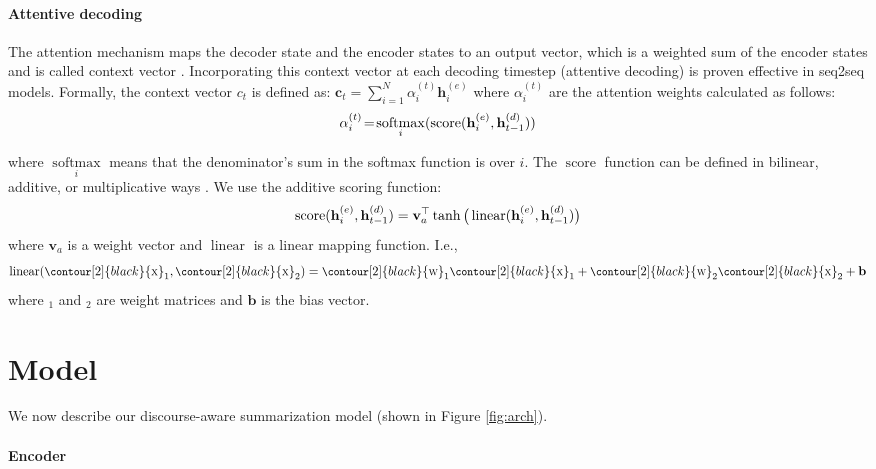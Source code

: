 \documentclass[11pt,a4paper]{article}
\newcommand{\V}[1][\mathbf]{#1}
\newcommand{\encstate}[1]{\mathbf{h}_{#1}^{(e)}}
\newcommand{\decstate}[1]{\mathbf{h}_{#1}^{(d)}}
\DeclareMathOperator{\linear}{linear}
\newcommand{\newsoftmax}{\mathop{\mathrm{softmax}}}
\DeclareMathOperator{\score}{score}
\begin{document}
\paragraph{Attentive decoding}

The attention mechanism maps the decoder state and the encoder states to an output vector, which is a weighted sum of the encoder states and is called context vector \cite{bahdanau2014neural}. Incorporating this context vector at each decoding timestep (attentive decoding) is proven effective in seq2seq models.
Formally, the context vector $c_t$ is defined as: $ \V{c}_t \!=\! \sum_{i=1}^{N}\alpha^{(t)}_i \encstate{i} $
where $\alpha^{(t)}_i$ are the attention weights calculated as follows:
\begin{equation}\small \alpha^{(t)}_i \!=\! \newsoftmax_{i}(\score(\encstate{i}, \decstate{t-1})) \end{equation}

\noindent where {\small$\newsoftmax\limits_{i}$} means that the denominator's sum in the softmax function is over $i$. The $\score$ function can be defined in bilinear, additive, or multiplicative ways \cite{luong2015effective}. We use the additive scoring function:
\begin{equation}
  \small
  \score(\encstate{i}, \decstate{t-1}) = \V{v}_a^\top \tanh \big( \linear(\encstate{i}, \decstate{t-1}) \big) \label{eq:score-attn}
\end{equation}
\noindent where $\V{v}_a$ is a weight vector and $\linear$ is a linear mapping function. I.e.,
\begin{equation}
\small
\linear(\contour[2]{black}{\textsc{x}}_1, \contour[2]{black}{\textsc{x}}_2) = \contour[2]{black}{\textsc{w}}_1 \contour[2]{black}{\textsc{x}}_1 + \contour[2]{black}{\textsc{w}}_2 \contour[2]{black}{\textsc{x}}_2 + \V{b}
\end{equation}
\noindent where $_1$ and $_2$ are weight matrices and $\V{b}$ is the bias vector.


\section{Model}


We now describe our discourse-aware summarization model (shown in Figure \ref{fig:arch}).

\paragraph{Encoder}
\end{document}

